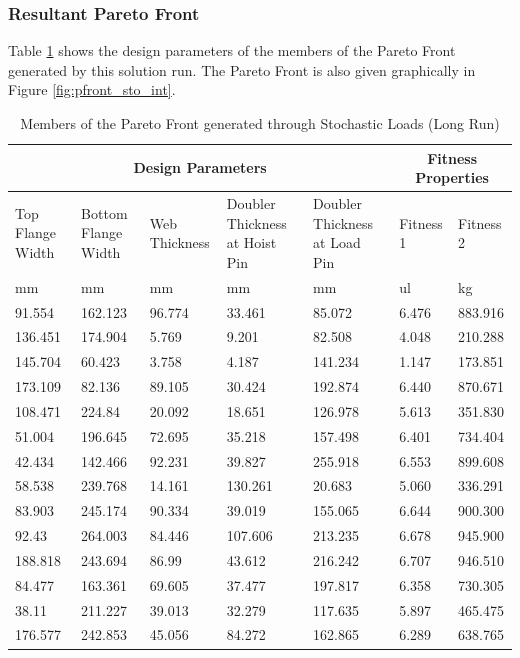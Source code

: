 \subsubsection{Resultant Pareto Front}
Table \ref{tab:pfront_sto_int} shows the design parameters of the members of the Pareto Front generated by this solution run. The Pareto Front is also given graphically in Figure \ref{fig:pfront_sto_int}. 
\begin{table}[!htbp]
	\caption{Members of the Pareto Front generated through Stochastic Loads (Long Run)}
\label{tab:pfront_sto_int}
\centering
\small
\begin{tabular}{|p{1.5cm}p{1.5cm}p{1.4cm}p{2cm}p{2cm}||p{1.5cm}p{1.5cm}|}
\hline
\multicolumn{5}{|c||}{Design Parameters}&\multicolumn{2}{|c|}{Fitness Properties}\\
\hline
Top Flange Width&Bottom Flange Width&Web Thickness&Doubler Thickness at Hoist Pin&Doubler Thickness at Load Pin&Fitness 1& Fitness 2\\
\hline
mm&mm&mm&mm&mm&ul&kg\\
\hline
91.554&162.123&96.774&33.461&85.072&6.476&883.916\\
136.451&174.904&5.769&9.201&82.508&4.048&210.288\\
145.704&60.423&3.758&4.187&141.234&1.147&173.851\\
173.109&82.136&89.105&30.424&192.874&6.440&870.671\\
108.471&224.84&20.092&18.651&126.978&5.613&351.830\\
51.004&196.645&72.695&35.218&157.498&6.401&734.404\\
42.434&142.466&92.231&39.827&255.918&6.553&899.608\\
58.538&239.768&14.161&130.261&20.683&5.060&336.291\\
83.903&245.174&90.334&39.019&155.065&6.644&900.300\\
92.43&264.003&84.446&107.606&213.235&6.678&945.900\\
188.818&243.694&86.99&43.612&216.242&6.707&946.510\\
84.477&163.361&69.605&37.477&197.817&6.358&730.305\\
38.11&211.227&39.013&32.279&117.635&5.897&465.475\\
176.577&242.853&45.056&84.272&162.865&6.289&638.765\\
\hline
\end{tabular}
\end{table}

